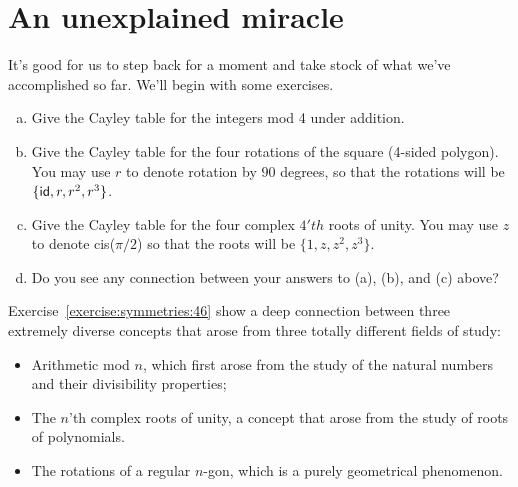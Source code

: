 \section{An unexplained miracle} \label{sec:miracle}

It's good for us to step back for a moment and take stock of what we've accomplished so far. We'll begin with some exercises.

\begin{exercise}{46}
\begin{enumerate}[(a)]
\item
Give the Cayley table for the integers mod 4 under addition.
\item 
Give the Cayley table for the four rotations of the square (4-sided polygon).  You may use $r$ to denote rotation by $90$ degrees, so that the rotations will be $\{ {\sf{i}d}, r, r^2, r^3  \}$.
\item 
Give the Cayley table for the four complex $4'{th}$ roots of unity. You may use $z$ to denote cis($\pi / 2$) so that the roots will be $\{ 1, z, z^2, z^3 \}$.
\item
Do you see any connection between your answers to (a), (b), and (c) above?
\end{enumerate}
\end{exercise}
%

Exercise~\ref{exercise:symmetries:46} show a deep connection between three extremely diverse concepts that arose from three totally different fields of study:
\begin{itemize}
\item
Arithmetic mod $n$, which first arose from the study of the natural numbers and their divisibility properties;
\item
The $n$'th complex roots of unity, a concept that arose from the study of roots of polynomials.
\item
The rotations of a regular $n$-gon, which is a purely geometrical phenomenon.
\end{itemize}

